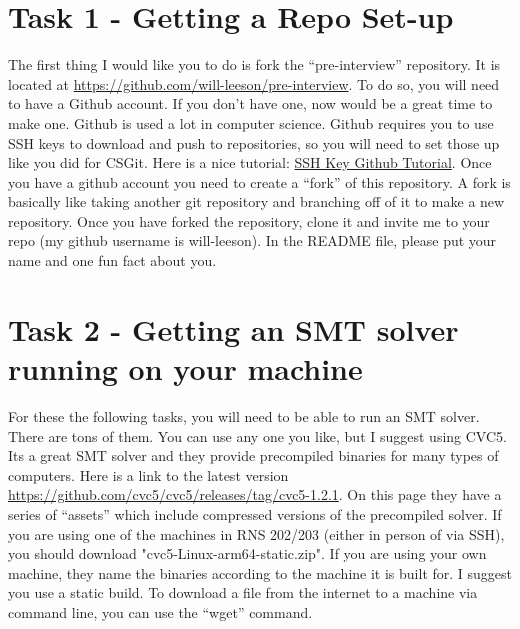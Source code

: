 \documentclass{article}
\begin{document}
\section*{Task 1 - Getting a Repo Set-up}
The first thing I would like you to do is fork the ``pre-interview'' repository.
It is located at \url{https://github.com/will-leeson/pre-interview}.
To do so, you will need to have a Github account.
If you don't have one, now would be a great time to make one. 
Github is used a lot in computer science.
Github requires you to use SSH keys to download and push to repositories, so you will need to set those up like you did for CSGit.
Here is a nice tutorial: \href{https://docs.github.com/en/authentication/connecting-to-github-with-ssh/generating-a-new-ssh-key-and-adding-it-to-the-ssh-agent}{SSH Key Github Tutorial}.
Once you have a github account you need to create a ``fork'' of this repository.
A fork is basically like taking another git repository and branching off of it to make a new repository.
Once you have forked the repository, clone it and invite me to your repo (my github username is will-leeson).
In the README file, please put your name and one fun fact about you.

\section*{Task 2 - Getting an SMT solver running on your machine}
For these the following tasks, you will need to be able to run an SMT solver.
There are tons of them.
You can use any one you like, but I suggest using CVC5.
Its a great SMT solver and they provide precompiled binaries for many types of computers.
Here is a link to the latest version \url{https://github.com/cvc5/cvc5/releases/tag/cvc5-1.2.1}.
On this page they have a series of ``assets'' which include compressed versions of the precompiled solver.
If you are using one of the machines in RNS 202/203 (either in person of via SSH), you should download "cvc5-Linux-arm64-static.zip".
If you are using your own machine, they name the binaries according to the machine it is built for. I suggest you use a static build.
To download a file from the internet to a machine via command line, you can use the ``wget'' command.
\end{document}
